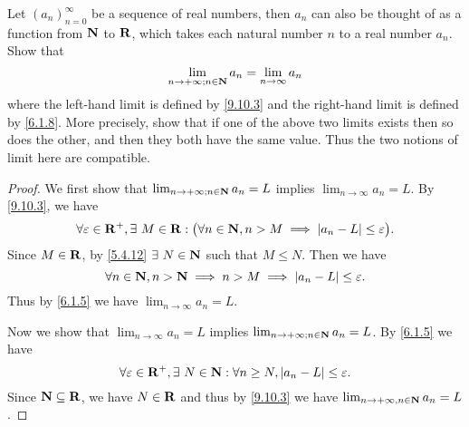 \exercisesection

\begin{exercise}\label{ex 9.10.1}
  Let \((a_n)_{n = 0}^\infty\) be a sequence of real numbers, then \(a_n\) can also be thought of as a function from \(\mathbf{N}\) to \(\mathbf{R}\), which takes each natural number \(n\) to a real number \(a_n\).
  Show that
  \[
    \lim_{n \to +\infty ; n \in \mathbf{N}} a_n = \lim_{n \to \infty} a_n
  \]
  where the left-hand limit is defined by \cref{9.10.3} and the right-hand limit is defined by \cref{6.1.8}.
  More precisely, show that if one of the above two limits exists then so does the other, and then they both have the same value.
  Thus the two notions of limit here are compatible.
\end{exercise}

\begin{proof}
  We first show that \(\lim_{n \to +\infty ; n \in \mathbf{N}} a_n = L\) implies \(\lim_{n \to \infty} a_n = L\).
  By \cref{9.10.3}, we have
  \[
    \forall \varepsilon \in \mathbf{R}^+, \exists\ M \in \mathbf{R} : \big(\forall n \in \mathbf{N}, n > M \implies \left\lvert a_n - L\right\rvert \leq \varepsilon\big).
  \]
  Since \(M \in \mathbf{R}\), by \cref{5.4.12} \(\exists\ N \in \N\) such that \(M \leq N\).
  Then we have
  \[
    \forall n \in \mathbf{N}, n > \mathbf{N} \implies n > M \implies \left\lvert a_n - L\right\rvert \leq \varepsilon.
  \]
  Thus by \cref{6.1.5} we have \(\lim_{n \to \infty} a_n = L\).

  Now we show that \(\lim_{n \to \infty} a_n = L\) implies \(\lim_{n \to +\infty ; n \in \mathbf{N}} a_n = L\).
  By \cref{6.1.5} we have
  \[
    \forall \varepsilon \in \mathbf{R}^+, \exists\ N \in \mathbf{N} : \forall n \geq N, \left\lvert a_n - L\right\rvert \leq \varepsilon.
  \]
  Since \(\mathbf{N} \subseteq \mathbf{R}\), we have \(N \in \mathbf{R}\) and thus by \cref{9.10.3} we have \(\lim_{n \to +\infty, n \in \mathbf{N}} a_n = L\).
\end{proof}